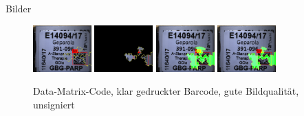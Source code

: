 \documentclass{beamer}
\begin{document}
  \begin{frame}{Bilder}
    \begin{figure}
      \includegraphics[width=0.2\textwidth]{./assets/E2017014094P1-a-6_GBG-PARP_0000000000009140-label_top1_positiveonlywithrest.jpg}
      \hfill
      \includegraphics[width=0.2\textwidth]{./assets/E2017014094P1-a-6_GBG-PARP_0000000000009140-label_top1_positiveonly.jpg}
      \hfill
      \includegraphics[width=0.2\textwidth]{./assets/E2017014094P1-a-6_GBG-PARP_0000000000009140-label_top1_proscons.jpg}
      \hfill
      \includegraphics[width=0.2\textwidth]{./assets/E2017014094P1-a-6_GBG-PARP_0000000000009140-label_top1_prosconsminweight.jpg}
      \caption{Data-Matrix-Code, klar gedruckter Barcode, gute Bildqualität, unsigniert}
    \end{figure}
  \end{frame}
\end{document}
